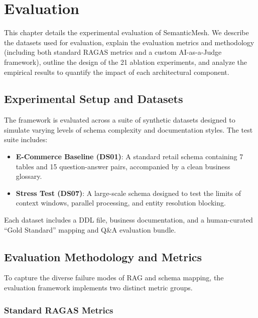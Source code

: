 \chapter{Evaluation}
\label{ch:evaluation}

This chapter details the experimental evaluation of SemanticMesh. We describe the datasets used for evaluation, explain the evaluation metrics and methodology (including both standard RAGAS metrics and a custom AI-as-a-Judge framework), outline the design of the 21 ablation experiments, and analyze the empirical results to quantify the impact of each architectural component.

\section{Experimental Setup and Datasets}
\label{sec:eval:datasets}

The framework is evaluated across a suite of synthetic datasets designed to simulate varying levels of schema complexity and documentation styles. The test suite includes:
\begin{itemize}
    \item \textbf{E-Commerce Baseline (DS01)}: A standard retail schema containing 7 tables and 15 question-answer pairs, accompanied by a clean business glossary.
    \item \textbf{Stress Test (DS07)}: A large-scale schema designed to test the limits of context windows, parallel processing, and entity resolution blocking.
\end{itemize}
Each dataset includes a DDL file, business documentation, and a human-curated ``Gold Standard'' mapping and Q\&A evaluation bundle.

\section{Evaluation Methodology and Metrics}
\label{sec:eval:metrics}

To capture the diverse failure modes of RAG and schema mapping, the evaluation framework implements two distinct metric groups.

\subsection{Standard RAGAS Metrics}
\label{sec:eval:ragas}

